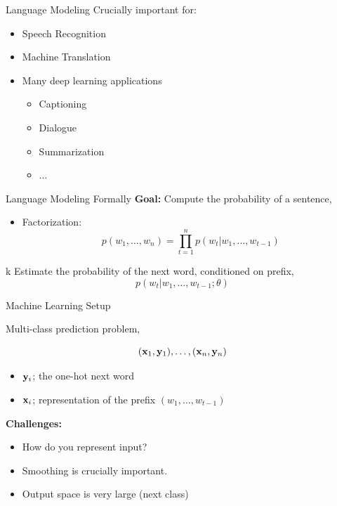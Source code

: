 \documentclass{beamer}
\begin{document}
{

}



\begin{frame}{Language Modeling}
  Crucially important for:

  \begin{itemize}
  \item Speech Recognition
  \item Machine Translation
  \item Many deep learning applications
    \begin{itemize}
    \item Captioning
    \item Dialogue
    \item Summarization
    \item $\dots$
    \end{itemize}
  \end{itemize}
\end{frame}


{

}


\begin{frame}{Language Modeling Formally}
  \textbf{Goal:} Compute the probability of a sentence,

  \begin{itemize}
  \item Factorization:
    \[ p(w_1, \ldots, w_n) = \prod_{t=1}^n p(w_t | w_1, \ldots, w_{t-1}) \]
  \end{itemize}
k
  Estimate the probability of the next word, conditioned on prefix,
  \[ p(w_t | w_1, \ldots, w_{t-1};\theta)\]
\end{frame}

\begin{frame}{Machine Learning Setup}

  Multi-class prediction problem, 

  \[ (\mathbf{x}_1, \mathbf{y}_1), \ldots, (\mathbf{x}_n, \mathbf{y}_n) \]
  \begin{itemize}
  \item $\mathbf{y}_i$; the one-hot next word
  \item $\mathbf{x}_i$; representation of the prefix $(w_1, \ldots, w_{t-1})$
  \end{itemize}
  \pause
  \textbf{Challenges:}
  \begin{itemize}
  \item How do you represent input?
  \item Smoothing is crucially important.
  \item Output space is very large (next class)
  \end{itemize}
\end{frame}
\end{document}
